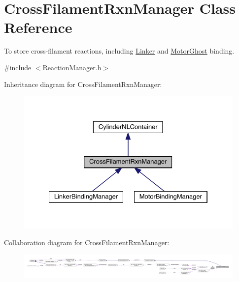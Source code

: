 \hypertarget{classCrossFilamentRxnManager}{\section{Cross\+Filament\+Rxn\+Manager Class Reference}
\label{classCrossFilamentRxnManager}
}


To store cross-\/filament reactions, including \hyperlink{classLinker}{Linker} and \hyperlink{classMotorGhost}{Motor\+Ghost} binding.  




{\ttfamily \#include $<$Reaction\+Manager.\+h$>$}



Inheritance diagram for Cross\+Filament\+Rxn\+Manager\+:
\nopagebreak
\begin{figure}[H]
\begin{center}
\leavevmode
\includegraphics[width=328pt]{classCrossFilamentRxnManager__inherit__graph}
\end{center}
\end{figure}


Collaboration diagram for Cross\+Filament\+Rxn\+Manager\+:\nopagebreak
\begin{figure}[H]
\begin{center}
\leavevmode
\includegraphics[width=350pt]{classCrossFilamentRxnManager__coll__graph}
\end{center}
\end{figure}
